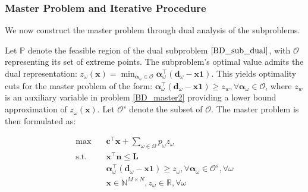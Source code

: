 
\subsubsection{Master Problem and Iterative Procedure}
We now construct the master problem through dual analysis of the subproblems. 


Let $\mathbb{P}$ denote the feasible region of the dual subproblem $\eqref{BD_sub_dual}$, with $\mathcal{O}$ representing its set of extreme points. The subproblem's optimal value admits the dual representation: $z_{\omega}(\mathbf{x}) = \min_{\bm{\alpha}_{\omega} \in \mathcal{O}} \bm{\alpha}_{\omega}^{\intercal}(\mathbf{d}_{\omega}- \mathbf{x} \mathbf{1})$. This yields optimality cuts for the master problem of the form: $\bm{\alpha}_{\omega}^{\intercal}(\mathbf{d}_{\omega}- \mathbf{x} \mathbf{1}) \geq z_w, \forall \bm{\alpha}_{\omega} \in \mathcal{O}$, where $z_w$ is an auxiliary variable in problem \eqref{BD_master2} providing a lower bound approximation of $z_{\omega}(\mathbf{x})$. Let $\mathcal{O}^{s}$ denote the subset of $\mathcal{O}$. The master problem is then formulated as:

\begin{equation}\label{BD_master2}
  \begin{aligned}
    \max \quad & \mathbf{c}^{\intercal} \mathbf{x} + \sum_{\omega \in \Omega} p_{\omega} z_{\omega} \\
    \text {s.t.} \quad & \mathbf{x}^{\intercal} \mathbf{n}  \leq \mathbf{L} \\
    & \bm{\alpha}_{\omega}^{\intercal}(\mathbf{d}_{\omega}- \mathbf{x} \mathbf{1}) \geq z_{\omega}, \forall \bm{\alpha}_{\omega} \in \mathcal{O}^{s}, \forall \omega \\
     & \mathbf{x} \in \mathbb{N}^{M \times N}, z_{\omega} \in \mathbb{R}, \forall \omega
  \end{aligned}
\end{equation}


